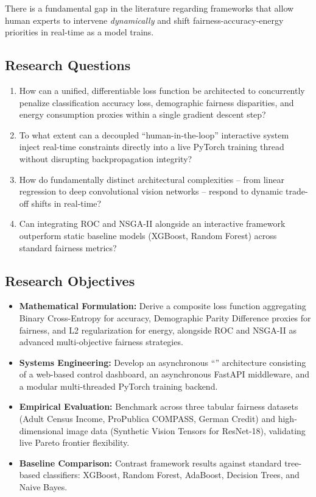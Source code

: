 \documentclass[12pt,a4paper]{article}
\begin{document}
There is a fundamental gap in the literature regarding frameworks that allow human experts to intervene \textit{dynamically} and shift fairness-accuracy-energy priorities in real-time as a model trains.

\subsection{Research Questions}

\begin{enumerate}
    \item How can a unified, differentiable loss function be architected to concurrently penalize classification accuracy loss, demographic fairness disparities, and energy consumption proxies within a single gradient descent step?
    \item To what extent can a decoupled ``human-in-the-loop'' interactive system inject real-time constraints directly into a live PyTorch training thread without disrupting backpropagation integrity?
    \item How do fundamentally distinct architectural complexities -- from linear regression to deep convolutional vision networks -- respond to dynamic trade-off shifts in real-time?
    \item Can integrating ROC and NSGA-II alongside an interactive framework outperform static baseline models (XGBoost, Random Forest) across standard fairness metrics?
\end{enumerate}

\subsection{Research Objectives}

\begin{itemize}
    \item \textbf{Mathematical Formulation:} Derive a composite loss function aggregating Binary Cross-Entropy for accuracy, Demographic Parity Difference proxies for fairness, and L2 regularization for energy, alongside ROC and NSGA-II as advanced multi-objective fairness strategies.
    \item \textbf{Systems Engineering:} Develop an asynchronous ``'' architecture consisting of a web-based control dashboard, an asynchronous FastAPI middleware, and a modular multi-threaded PyTorch training backend.
    \item \textbf{Empirical Evaluation:} Benchmark across three tabular fairness datasets (Adult Census Income, ProPublica COMPASS, German Credit) and high-dimensional image data (Synthetic Vision Tensors for ResNet-18), validating live Pareto frontier flexibility.
    \item \textbf{Baseline Comparison:} Contrast framework results against standard tree-based classifiers: XGBoost, Random Forest, AdaBoost, Decision Trees, and Naive Bayes.
\end{itemize}
\end{document}
